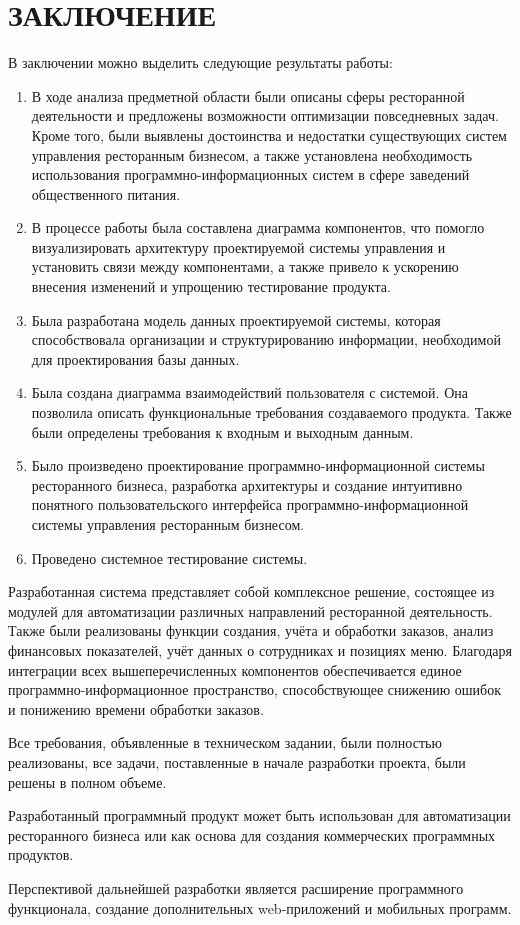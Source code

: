 \clearpage
{}
\section*{ЗАКЛЮЧЕНИЕ}
В заключении можно выделить следующие результаты работы:
\begin{enumerate}
	\item В ходе анализа предметной области были описаны сферы ресторанной деятельности и предложены возможности оптимизации повседневных задач. Кроме того, были выявлены достоинства и недостатки существующих систем управления ресторанным бизнесом, а также установлена необходимость использования программно-информационных систем в сфере заведений общественного питания. 
	\item В процессе работы была составлена диаграмма компонентов, что помогло визуализировать архитектуру проектируемой системы управления и установить связи между компонентами, а также привело к ускорению внесения изменений и упрощению тестирование продукта.
	\item Была разработана модель данных проектируемой системы, которая способствовала организации и структурированию информации, необходимой для проектирования базы данных.
	\item Была создана диаграмма взаимодействий пользователя с системой. Она позволила описать функциональные требования создаваемого продукта. Также были определены требования к входным и выходным данным.  
	\item Было произведено проектирование программно-информационной системы ресторанного бизнеса, разработка архитектуры  и создание интуитивно понятного пользовательского интерфейса программно-информационной системы управления ресторанным бизнесом.
	\item Проведено системное тестирование системы.
\end{enumerate}

Разработанная система представляет собой комплексное решение, состоящее из модулей для автоматизации различных направлений ресторанной деятельность. Также были реализованы функции создания, учёта и обработки заказов, анализ финансовых показателей, учёт данных о сотрудниках и позициях меню. Благодаря интеграции всех вышеперечисленных компонентов обеспечивается единое программно-информационное пространство, способствующее снижению ошибок и понижению времени обработки заказов.

Все требования, объявленные в техническом задании, были полностью реализованы, все задачи, поставленные в начале разработки проекта, были решены в полном объеме.


Разработанный программный продукт может быть использован для автоматизации ресторанного бизнеса или как основа для создания коммерческих программных продуктов.

Перспективой дальнейшей разработки является расширение программного функционала, создание дополнительных web-приложений и мобильных программ.

